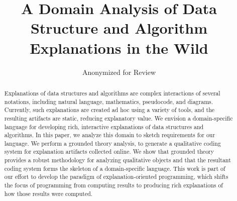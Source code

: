 \documentclass[sigconf]{acmart}
\begin{document}
\title{A Domain Analysis of Data Structure and Algorithm Explanations in the Wild}


\author{Anonymized for Review}


\begin{abstract}
  Explanations of data structures and algorithms are complex interactions of
  several notations, including natural language, mathematics, pseudocode, and
  diagrams. Currently, such explanations are created ad hoc using a variety of
  tools, and the resulting artifacts are static, reducing explanatory value. We
  envision a domain-specific language for developing rich, interactive
  explanations of data structures and algorithms. In this paper, we analyze this
  domain to sketch requirements for our language. We perform a grounded theory
  analysis, to generate a qualitative coding system for explanation artifacts
  collected online. We show that grounded theory provides a robust methodology
  for analyzing qualitative objects and that the resultant coding system forms
  the skeleton of a domain-specific language. This work is part of our effort to
  develop the paradigm of explanation-oriented programming, which shifts the
  focus of programming from computing results to producing rich explanations of
  how those results were computed.
\end{abstract}

%
%
\end{document}

